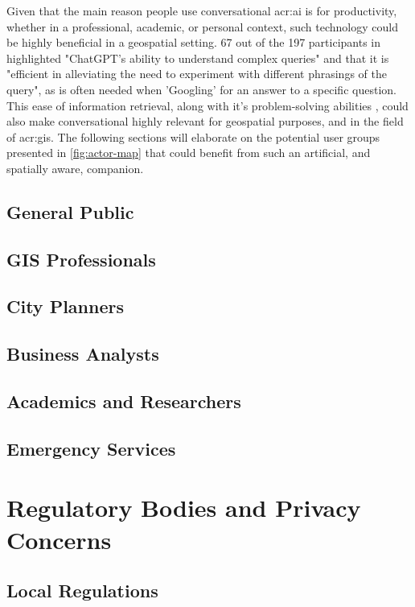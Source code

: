 Given that the main reason people use conversational \acrshort{acr:ai} is for productivity, whether in a professional, academic, or personal context, such technology could be highly beneficial in a geospatial setting. 67 out of the 197 participants in \cite[18]{skjuveWhyPeopleUse2023} highlighted "ChatGPT's ability to understand complex queries" and that it is "efficient in alleviating the need to experiment with different phrasings of the query", as is often needed when 'Googling' for an answer to a specific question. This ease of information retrieval, along with it's problem-solving abilities \citep[20]{skjuveWhyPeopleUse2023}, could also make conversational  highly relevant for geospatial purposes, and in the field of \acrshort{acr:gis}. The following sections will elaborate on the potential user groups presented in \autoref{fig:actor-map} that could benefit from such an artificial, and spatially aware, companion.

\subsection{General Public}
\subsection{GIS Professionals}
\subsection{City Planners}
\subsection{Business Analysts}
\subsection{Academics and Researchers}
\subsection{Emergency Services}

\section{Regulatory Bodies and Privacy Concerns}\label{sec:regulatory-bodies-and-privacy-concerns}

\subsection{Local Regulations}
